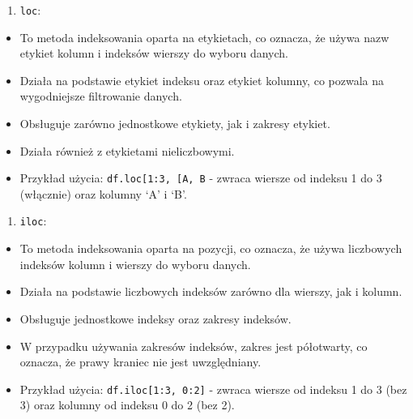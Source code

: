 \documentclass[
  polish,
  letterpaper,
  DIV=11,
  numbers=noendperiod]{scrreprt}
\providecommand{\tightlist}{%
  \setlength{\itemsep}{0pt}\setlength{\parskip}{0pt}}
\begin{document}
\begin{enumerate}
\def\labelenumi{\arabic{enumi}.}
\tightlist
\item
  \texttt{loc}:
\end{enumerate}

\begin{itemize}
\tightlist
\item
  To metoda indeksowania oparta na etykietach, co oznacza, że używa nazw
  etykiet kolumn i indeksów wierszy do wyboru danych.
\item
  Działa na podstawie etykiet indeksu oraz etykiet kolumny, co pozwala
  na wygodniejsze filtrowanie danych.
\item
  Obsługuje zarówno jednostkowe etykiety, jak i zakresy etykiet.
\item
  Działa również z etykietami nieliczbowymi.
\item
  Przykład użycia:
  \texttt{df.loc{[}1:3,\ {[}\textquotesingle{}A\textquotesingle{},\ \textquotesingle{}B\textquotesingle{}{]}{]}}
  - zwraca wiersze od indeksu 1 do 3 (włącznie) oraz kolumny `A' i `B'.
\end{itemize}

\begin{enumerate}
\def\labelenumi{\arabic{enumi}.}
\setcounter{enumi}{1}
\tightlist
\item
  \texttt{iloc}:
\end{enumerate}

\begin{itemize}
\tightlist
\item
  To metoda indeksowania oparta na pozycji, co oznacza, że używa
  liczbowych indeksów kolumn i wierszy do wyboru danych.
\item
  Działa na podstawie liczbowych indeksów zarówno dla wierszy, jak i
  kolumn.
\item
  Obsługuje jednostkowe indeksy oraz zakresy indeksów.
\item
  W przypadku używania zakresów indeksów, zakres jest półotwarty, co
  oznacza, że prawy kraniec nie jest uwzględniany.
\item
  Przykład użycia: \texttt{df.iloc{[}1:3,\ 0:2{]}} - zwraca wiersze od
  indeksu 1 do 3 (bez 3) oraz kolumny od indeksu 0 do 2 (bez 2).
\end{itemize}
\end{document}
